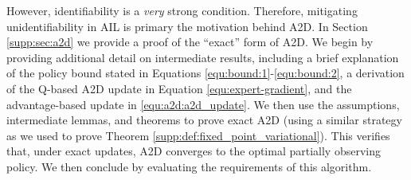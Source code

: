 However, identifiability is a \emph{very} strong condition.  Therefore, mitigating unidentifiability in AIL is primary the motivation behind A2D.  In Section \ref{supp:sec:a2d} we provide a proof of the ``exact'' form of A2D.  We begin by providing additional detail on intermediate results, including a brief explanation of the policy bound stated in Equations \eqref{equ:bound:1}-\eqref{equ:bound:2}, a derivation of the Q-based A2D update in Equation \eqref{equ:expert-gradient}, and the advantage-based update in \eqref{equ:a2d:a2d_update}.  We then use the assumptions, intermediate lemmas, and theorems to prove exact A2D (using a similar strategy as we used to prove Theorem \ref{supp:def:fixed_point_variational}).  This verifies that, under exact updates, A2D converges to the optimal partially observing policy.  We then conclude by evaluating the requirements of this algorithm.  





